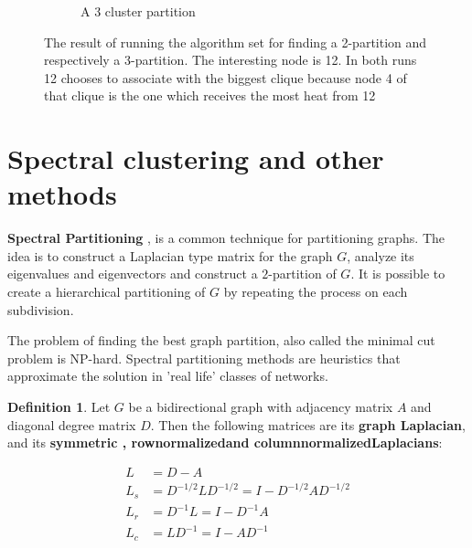 \documentclass[a4paper,10pt]{article}
\theoremstyle{definition}
\newtheorem{mydef}{Definition}[section]
\theoremstyle{remark}
\theoremstyle{plain}
\begin{document}
\begin{figure}
\begin{framed}
\begin{subfigure}[b]{0.5\textwidth}
\caption{A 3 cluster partition}
\label{fig:examplecoolwarm3cluster}
\end{subfigure}
\caption{The result of running the algorithm set for finding a 2-partition and
respectively a 3-partition. The interesting node is 12. In both runs 12 chooses
to associate with the biggest clique because node 4 of that clique is the one
which receives the most heat from 12}
\label{fig:exampleCoolWarmClustering}
\end{framed}
\end{figure}



\section{Spectral clustering and other methods}

\textbf{Spectral Partitioning} 
\cite{von2007tutorial, naumov2016parallel, WikipediaGraphPartition, WikipediaSpectralClustering},
is a common technique for partitioning graphs. The idea is to construct a
Laplacian type matrix \cite{WikipediaLaplacianMatrix} for the graph
$G$,
analyze its eigenvalues and eigenvectors and construct a $2$-partition of $G$.
It is possible to create a hierarchical partitioning of $G$ by repeating the
process on each subdivision.

The problem of finding the best graph partition, also called the minimal cut
problem is NP-hard. Spectral partitioning methods are heuristics that
approximate the solution in 'real life' classes of networks.

\begin{mydef}
\label{def:Laplacian}
Let $G$ be a bidirectional graph with adjacency matrix $A$ and diagonal degree
matrix $D$.
Then the following matrices are its \textbf{graph Laplacian}, and its
\textbf{symmetric\textemdash
, row\textendash normalized\textemdash and column\textendash normalized\textemdash Laplacians}:  

\begin{equation}
\begin{aligned}
L & = D - A \\
L_s & = D^{-1/2}LD^{-1/2} = I - D^{-1/2}AD^{-1/2} \\
L_r & = D^{-1}L = I - D^{-1}A \\
L_c & = LD^{-1} = I - AD^{-1}
\end{aligned}
\end{equation}
\end{mydef}
\end{document}
